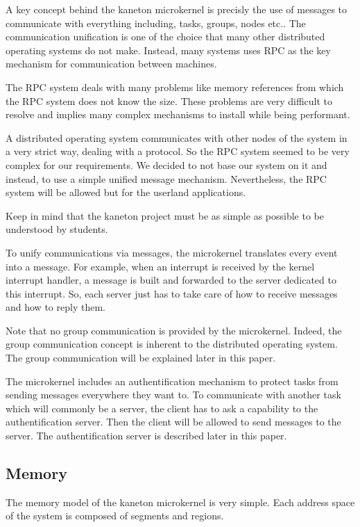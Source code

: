 \documentclass[10pt,a4wide]{article}
\begin{document}
\begin{multicols}{2}
A key concept behind the kaneton microkernel is precisly the use of messages
to communicate with everything including, tasks, groups, nodes etc..
The communication unification is one of the choice that many other distributed
operating systems do not make. Instead, many systems uses RPC as the key
mechanism for communication between machines.

The RPC system deals with many problems like memory references from which the
RPC system does not know the size. These problems are very difficult to
resolve and implies many complex mechanisms to install while being performant.

A distributed operating system communicates with other nodes of the system in
a very strict way, dealing with a protocol. So the RPC system seemed to be very
complex for our requirements. We decided to not base our system on it and
instead, to use a simple unified message mechanism. Nevertheless, the RPC
system will be allowed but for the userland applications.

Keep in mind that the kaneton project must be as simple as possible to be
understood by students.

To unify communications via messages, the microkernel translates every event
into a message. For example, when an interrupt is received by the kernel
interrupt handler, a message is built and forwarded to the server dedicated
to this interrupt. So, each server just has to take care of how to receive
messages and how to reply them.

Note that no group communication is provided by the microkernel. Indeed, the
group communication concept is inherent to the distributed operating system.
The group communication will be explained later in this paper.

The microkernel includes an authentification mechanism to protect tasks from
sending messages everywhere they want to. To communicate with another task
which will commonly be a server, the client has to ask a capability to
the authentification server. Then the client will be allowed to send messages
to the server. The authentification server is described later in this paper.

\subsection{Memory}

The memory model of the kaneton microkernel is very simple. Each address space
of the system is composed of segments and regions.


\end{multicols}
\end{document}
